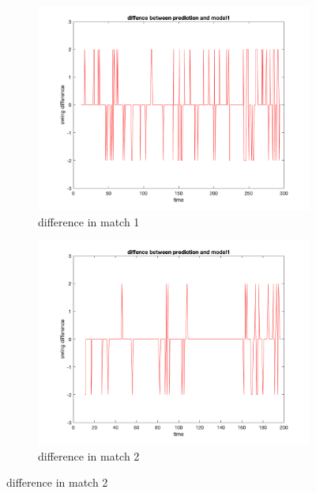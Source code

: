 \begin{figure}[H]
    \centering
    \begin{subfigure}[b]{0.34\textwidth}
        \includegraphics[width=\linewidth]{mainmatter/imgs/swing_diff_match1_overfit.png}
        \caption{difference in match 1}
    \end{subfigure}\hspace{-0.02\textwidth}
    \begin{subfigure}[b]{0.34\textwidth}
        \includegraphics[width=\linewidth]{mainmatter/imgs/swing_diff_match2_overfit.png}
        \caption{difference in match 2}
    \end{subfigure}\hspace{-0.02\textwidth}

\end{figure}
